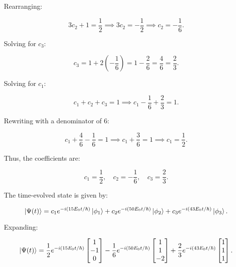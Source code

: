 \documentclass[12pt]{article}
\begin{document}
Rearranging:

\begin{equation}
    3c_2 + 1 = \frac{1}{2} \implies 3c_2 = -\frac{1}{2} \implies c_2 = -\frac{1}{6}.
\end{equation}

Solving for $c_3$:

\begin{equation}
    c_3 = 1 + 2 \left(-\frac{1}{6} \right) = 1 - \frac{2}{6} = \frac{4}{6} = \frac{2}{3}.
\end{equation}

Solving for $c_1$:

\begin{equation}
    c_1 + c_2 + c_3 = 1 \implies c_1 - \frac{1}{6} + \frac{2}{3} = 1.
\end{equation}

Rewriting with a denominator of 6:

\begin{equation}
    c_1 + \frac{4}{6} - \frac{1}{6} = 1 \implies c_1 + \frac{3}{6} = 1 \implies c_1 = \frac{1}{2}.
\end{equation}

Thus, the coefficients are:

\begin{equation}
    c_1 = \frac{1}{2}, \quad c_2 = -\frac{1}{6}, \quad c_3 = \frac{2}{3}.
\end{equation}

The time-evolved state is given by:

\begin{equation}
    \ket{\Psi(t)} = c_1 e^{-i (15E_0 t / \hbar)} \ket{\phi_1} + c_2 e^{-i (50E_0 t / \hbar)} \ket{\phi_2} + c_3 e^{-i (43E_0 t / \hbar)} \ket{\phi_3}.
\end{equation}

Expanding:

\begin{equation}
    \ket{\Psi(t)} =
    \frac{1}{2} e^{-i (15E_0 t / \hbar)} \begin{bmatrix} 1 \\ -1 \\ 0 \end{bmatrix}
    - \frac{1}{6} e^{-i (50E_0 t / \hbar)} \begin{bmatrix} 1 \\ 1 \\ -2 \end{bmatrix}
    + \frac{2}{3} e^{-i (43E_0 t / \hbar)} \begin{bmatrix} 1 \\ 1 \\ 1 \end{bmatrix}.
\end{equation}
\end{document}
